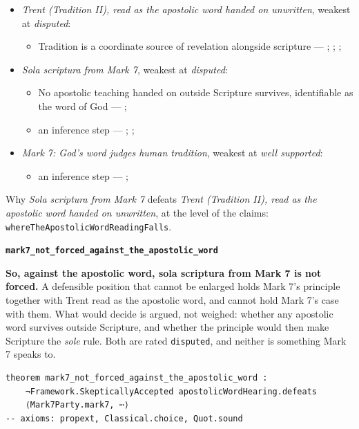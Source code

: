 \documentclass[11pt]{article}
\begin{document}
\begin{itemize}
\item \emph{Trent (Tradition II), read as the apostolic word handed on unwritten}, weakest at \emph{disputed}:
\begin{itemize}
\item Tradition is a coordinate source of revelation alongside scripture --- \cite[Trent, Session IV (1546), Decree on Sacred Books and Traditions]{tanner-decrees-1990}; \cite{mathison-shape-sola-scriptura-2001}; \cite{geiselmann-meaning-of-tradition-1966}; \cite{congar-tradition-and-traditions-1966}
\end{itemize}
\item \emph{Sola scriptura from Mark 7}, weakest at \emph{disputed}:
\begin{itemize}
\item No apostolic teaching handed on outside Scripture survives, identifiable as the word of God --- \cite[506]{whitaker-disputation-1849}; \cite[I.6]{westminster-confession-1647}
\item an inference step --- \cite{geiselmann-meaning-of-tradition-1966}; \cite[Vatican I (1870), Pastor Aeternus, ch. 4]{tanner-decrees-1990}; \cite{florovsky-bible-church-tradition-1972}
\end{itemize}
\item \emph{Mark 7: God's word judges human tradition}, weakest at \emph{well supported}:
\begin{itemize}
\item an inference step --- \cite[Vatican II (1965), Dei Verbum 10]{tanner-decrees-1990}; \cite[IV.x.23]{calvin-institutes-1960}
\end{itemize}
\end{itemize}
\noindent Why \emph{Sola scriptura from Mark 7} defeats \emph{Trent (Tradition II), read as the apostolic word handed on unwritten}, at the level of the claims: \texttt{where\allowbreak{}The\allowbreak{}Apostolic\allowbreak{}Word\allowbreak{}Reading\allowbreak{}Falls}.
\par\medskip\noindent\textbf{\texttt{mark7\_\allowbreak{}not\_\allowbreak{}forced\_\allowbreak{}against\_\allowbreak{}the\_\allowbreak{}apostolic\_\allowbreak{}word}}\par\nobreak\noindent
\textbf{So, against the apostolic word, sola scriptura from Mark 7 is not forced.} A defensible position that cannot be enlarged holds Mark 7's principle together with Trent read as the apostolic word, and cannot hold Mark 7's case with them. What would decide is argued, not weighed: whether any apostolic word survives outside Scripture, and whether the principle would then make Scripture the \emph{sole} rule. Both are rated \texttt{disputed}, and neither is something Mark 7 speaks to.

{\small\begin{verbatim}
theorem mark7_not_forced_against_the_apostolic_word :
    ¬Framework.SkepticallyAccepted apostolicWordHearing.defeats
    ⟨Mark7Party.mark7, ⋯⟩
-- axioms: propext, Classical.choice, Quot.sound
\end{verbatim}}



\end{document}
